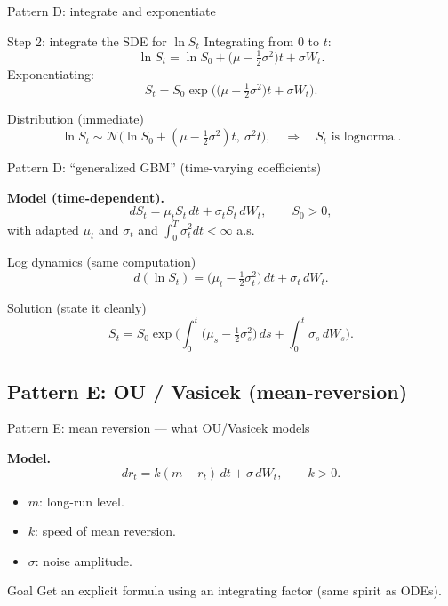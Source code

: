 \documentclass[10pt,aspectratio=169]{beamer}
\begin{document}
\begin{frame}{Pattern D: integrate and exponentiate}

\begin{block}{Step 2: integrate the SDE for $\ln S_t$}
Integrating from $0$ to $t$:\pause
\[
\ln S_t
=
\ln S_0 + \Big(\mu-\tfrac12\sigma^2\Big)t + \sigma W_t.
\]
Exponentiating:\pause
\[
S_t
=
S_0\exp\!\Big(\big(\mu-\tfrac12\sigma^2\big)t+\sigma W_t\Big).
\]
\end{block}\pause

\begin{alertblock}{Distribution (immediate)}
\[
\ln S_t \sim \mathcal{N}\!\Big(\ln S_0+(\mu-\tfrac12\sigma^2)t,\ \sigma^2 t\Big),
\quad\Rightarrow\quad
S_t \text{ is lognormal.}
\]
\end{alertblock}

\end{frame}

\begin{frame}{Pattern D: ``generalized GBM'' (time-varying coefficients)}

\textbf{Model (time-dependent).}\pause\;
\[
dS_t = \mu_t S_t\,dt + \sigma_t S_t\,dW_t,
\qquad S_0>0,
\]
with adapted $\mu_t$ and $\sigma_t$ and $\int_0^T \sigma_t^2 dt<\infty$ a.s.\pause

\begin{block}{Log dynamics (same computation)}
\[
d(\ln S_t)=\Big(\mu_t-\tfrac12\sigma_t^2\Big)\,dt+\sigma_t\,dW_t.
\]
\end{block}\pause

\begin{block}{Solution (state it cleanly)}
\[
S_t
=
S_0\exp\!\Big(
\int_0^t\big(\mu_s-\tfrac12\sigma_s^2\big)\,ds
+
\int_0^t \sigma_s\,dW_s
\Big).
\]
\end{block}

\end{frame}

\subsection{Pattern E: OU / Vasicek (mean-reversion)}

\begin{frame}{Pattern E: mean reversion — what OU/Vasicek models}

\textbf{Model.}\pause\;
\[
dr_t = k(m-r_t)\,dt + \sigma\,dW_t,
\qquad k>0.
\]

\medskip
\begin{itemize}
  \item $m$: long-run level.\pause
  \item $k$: speed of mean reversion.\pause
  \item $\sigma$: noise amplitude.\pause
\end{itemize}

\begin{alertblock}{Goal}
Get an explicit formula using an integrating factor (same spirit as ODEs).
\end{alertblock}

\end{frame}
\end{document}
